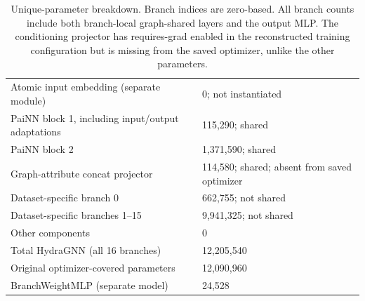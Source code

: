 \begin{table}[t]
\centering
\small
\caption{Unique-parameter breakdown. Branch indices are zero-based. All branch counts include both branch-local graph-shared layers and the output MLP. The conditioning projector has requires-grad enabled in the reconstructed training configuration but is missing from the saved optimizer, unlike the other parameters.}
\label{tab:painn-parameter-breakdown}
\begin{tabular}{p{}p{}}
\hline
Atomic input embedding (separate module) & 0; not instantiated \\
PaiNN block 1, including input/output adaptations & 115,290; shared \\
PaiNN block 2 & 1,371,590; shared \\
Graph-attribute concat projector & 114,580; shared; absent from saved optimizer \\
Dataset-specific branch 0 & 662,755; not shared \\
Dataset-specific branches 1--15 & 9,941,325; not shared \\
Other components & 0 \\
Total HydraGNN (all 16 branches) & 12,205,540 \\
Original optimizer-covered parameters & 12,090,960 \\
BranchWeightMLP (separate model) & 24,528 \\
\hline
\end{tabular}
\end{table}
